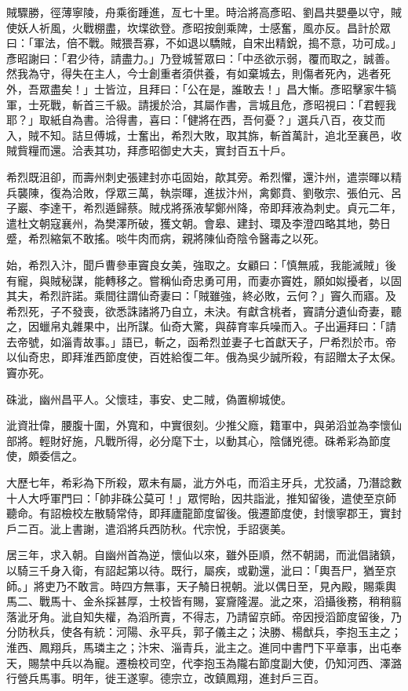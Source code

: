 \begin{pinyinscope}
 賊驟勝，徑薄寧陵，舟乘銜踵進，亙七十里。時洽將高彥昭、劉昌共嬰壘以守，賊使妖人祈風，火戰棚盡，坎堞欲登。彥昭按劍乘陴，士感奮，風亦反。昌計於眾曰：「軍法，倍不戰。賊猥吾寡，不如退以驕賊，自宋出精銳，搗不意，功可成。」彥昭謝曰：「君少待，請盡力。」乃登城誓眾曰：「中丞欲示弱，覆而取之，誠善。然我為守，得失在主人，今士創重者須供養，有如棄城去，則傷者死內，逃者死外，吾眾盡矣！」士皆泣，且拜曰：「公在是，誰敢去！」昌大慚。彥昭擊家牛犒軍，士死戰，斬首三千級。請援於洽，其屬作書，言城且危，彥昭視曰：「君輕我耶？」取紙自為書。洽得書，喜曰：「健將在西，吾何憂？」選兵八百，夜艾而入，賊不知。詰旦傅城，士奮出，希烈大敗，取其旆，斬首萬計，追北至襄邑，收賊貲糧而還。洽表其功，拜彥昭御史大夫，實封百五十戶。



 希烈既沮卻，而壽州刺史張建封亦屯固始，歊其旁。希烈懼，還汴州，遣崇暉以精兵襲陳，復為洽敗，俘眾三萬，執崇暉，進拔汴州，禽鄭賁、劉敬宗、張伯元、呂子巖、李達干，希烈遁歸蔡。賊戍將孫液挈鄭州降，帝即拜液為刺史。貞元二年，遣杜文朝寇襄州，為樊澤所破，獲文朝。會皋、建封、環及李澄四略其地，勢日蹙，希烈縮氣不敢搖。啖牛肉而病，親將陳仙奇陰令醫毒之以死。



 始，希烈入汴，聞戶曹參車竇良女美，強取之。女顧曰：「慎無戚，我能滅賊」後有寵，與賊秘謀，能轉移之。嘗稱仙奇忠勇可用，而妻亦竇姓，願如姒擾者，以固其夫，希烈許諾。乘間往謂仙奇妻曰：「賊雖強，終必敗，云何？」竇久而寤。及希烈死，子不發喪，欲悉誅諸將乃自立，未決。有獻含桃者，竇請分遺仙奇妻，聽之，因蠟帛丸雜果中，出所謀。仙奇大驚，與薛育率兵噪而入。子出遍拜曰：「請去帝號，如淄青故事。」語已，斬之，函希烈並妻子七首獻天子，尸希烈於市。帝以仙奇忠，即拜淮西節度使，百姓給復二年。俄為吳少誠所殺，有詔贈太子太保。竇亦死。



 硃泚，幽州昌平人。父懷珪，事安、史二賊，偽置柳城使。



 泚資壯偉，腰腹十圍，外寬和，中實很刻。少推父廕，籍軍中，與弟滔並為李懷仙部將。輕財好施，凡戰所得，必分麾下士，以動其心，陰儲兇德。硃希彩為節度使，頗委信之。



 大歷七年，希彩為下所殺，眾未有屬，泚方外屯，而滔主牙兵，尤狡譎，乃潛諗數十人大呼軍門曰：「帥非硃公莫可！」眾愕眙，因共詣泚，推知留後，遣使至京師聽命。有詔檢校左散騎常侍，即拜廬龍節度留後。俄遷節度使，封懷寧郡王，實封戶二百。泚上書謝，遣滔將兵西防秋。代宗悅，手詔褒美。



 居三年，求入朝。自幽州首為逆，懷仙以來，雖外臣順，然不朝謁，而泚倡諸鎮，以騎三千身入衛，有詔起第以待。既行，屬疾，或勸還，泚曰：「輿吾尸，猶至京師。」將吏乃不敢言。時四方無事，天子觭日視朝。泚以偶日至，見內殿，賜乘輿馬二、戰馬十、金糸採甚厚，士校皆有賜，宴齎隆渥。泚之來，滔攝後務，稍稍翦落泚牙角。泚自知失權，為滔所賣，不得志，乃請留京師。帝因授滔節度留後，乃分防秋兵，使各有統：河陽、永平兵，郭子儀主之；決勝、楊猷兵，李抱玉主之；淮西、鳳翔兵，馬璘主之；汴宋、淄青兵，泚主之。進同中書門下平章事，出屯奉天，賜禁中兵以為寵。遷檢校司空，代李抱玉為隴右節度副大使，仍知河西、澤潞行營兵馬事。明年，徙王遂寧。德宗立，改鎮鳳翔，進封戶三百。




\end{pinyinscope}
